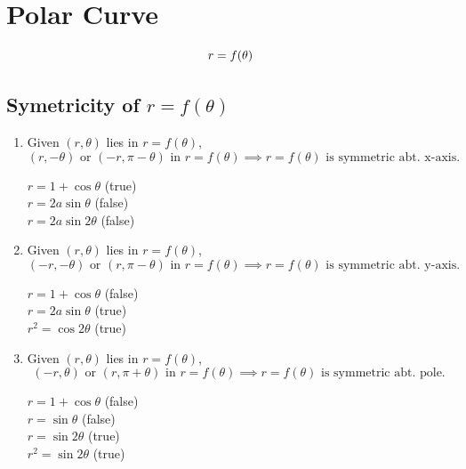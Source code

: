 \chapter{Polar Curve}
\label{chap:polar-curve}

\begin{definition}
  \label{def:polar-curve}
  \begin{equation}
    \label{eqn:polar-curve}
    \begin{displaystyle}
      r = f(\theta)
    \end{displaystyle}
  \end{equation}
\end{definition}

\section{Symetricity of \(r=f(\theta)\)}
\label{sec:symetricity-of-r-f-theta}

\begin{enumerate}
  \item Given \((r,\theta)\) lies in \(r=f(\theta)\),
    \[
      (r,-\theta) \text{ or } (-r,\pi-\theta) \text{ in  } r
      = f(\theta) \implies r = f(\theta) \text{ is symmetric
      abt. x-axis. }
    \]
    \begin{eg}
      \(r=1+\cos\theta\) \quad (true)\\
      \(r=2a\sin\theta\) \quad (false)\\
      \(r=2a\sin2\theta\) \quad (false)
    \end{eg}

  \item Given \((r,\theta)\) lies in \(r=f(\theta)\),
    \[
      (-r,-\theta) \text{ or } (r,\pi-\theta) \text{ in  } r
      = f(\theta) \implies r = f(\theta) \text{ is symmetric
      abt. y-axis. }
    \]
    \begin{eg}
      \(r=1+\cos\theta\) \quad (false)\\
      \(r=2a\sin\theta\) \quad (true)\\
      \(r^{2}=\cos2\theta\) \quad (true)
    \end{eg}

  \item Given \((r,\theta)\) lies in \(r=f(\theta)\),
    \[
      (-r,\theta) \text{ or } (r,\pi+\theta) \text{ in  } r
      = f(\theta) \implies r = f(\theta) \text{ is symmetric
      abt. pole. }
    \]
    \begin{eg}
      \(r=1+\cos\theta\) \quad (false)\\
      \(r=\sin\theta\) \quad (false)\\
      \(r=\sin2\theta\) \quad (true)\\
      \(r^2=\sin2\theta\) \quad (true)
    \end{eg}

\end{enumerate}

